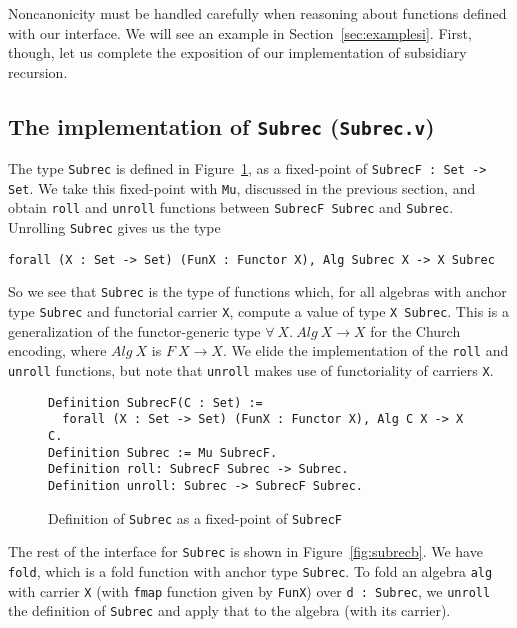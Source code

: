 \documentclass[a4paper,USenglish]{lipics-v2021}
\begin{document}
Noncanonicity must be handled carefully when reasoning about functions
defined with our interface.  We will see an example in
Section~\ref{sec:examplesi}.  First, though, let us complete the
exposition of our implementation of subsidiary recursion.

\subsection{The implementation of \texttt{Subrec} (\texttt{Subrec.v})}
\label{sec:subrecimpl}

The type \verb|Subrec| is defined in Figure~\ref{fig:subrec}, as a
fixed-point of \verb|SubrecF : Set -> Set|.  We take this fixed-point
with \verb|Mu|, discussed in the previous section, and obtain \verb|roll|
and \verb|unroll| functions between \verb|SubrecF Subrec| and \verb|Subrec|.
Unrolling \verb|Subrec| gives us the type
\begin{verbatim}
forall (X : Set -> Set) (FunX : Functor X), Alg Subrec X -> X Subrec
\end{verbatim}
\noindent So we see that \verb|Subrec| is the type of functions which,
for all algebras with anchor type \verb|Subrec| and functorial carrier
\verb|X|, compute a value of type \verb|X Subrec|.  This is a
generalization of the functor-generic type
$\forall\ X.\ \textit{Alg}\ X \to X$ for the Church encoding, where
$\textit{Alg}\ X$ is $F\ X \to X$.  We elide the implementation of the
\verb|roll| and \verb|unroll| functions, but note that \verb|unroll|
makes use of functoriality of carriers \verb|X|.

\begin{figure}
\begin{verbatim}
Definition SubrecF(C : Set) := 
  forall (X : Set -> Set) (FunX : Functor X), Alg C X -> X C.
Definition Subrec := Mu SubrecF.
Definition roll: SubrecF Subrec -> Subrec.
Definition unroll: Subrec -> SubrecF Subrec.
\end{verbatim}
\caption{Definition of \texttt{Subrec} as a fixed-point of \texttt{SubrecF}}
\label{fig:subrec}
\end{figure}

The rest of the interface for \verb|Subrec| is shown in
Figure~\ref{fig:subrecb}.  We have \verb|fold|, which is a fold
function with anchor type \verb|Subrec|.  To fold an algebra
\verb|alg| with carrier \verb|X| (with \verb|fmap| function given by
\verb|FunX|) over \verb|d : Subrec|, we \verb|unroll| the
definition of \verb|Subrec| and apply that to the algebra (with its
carrier).
\end{document}
